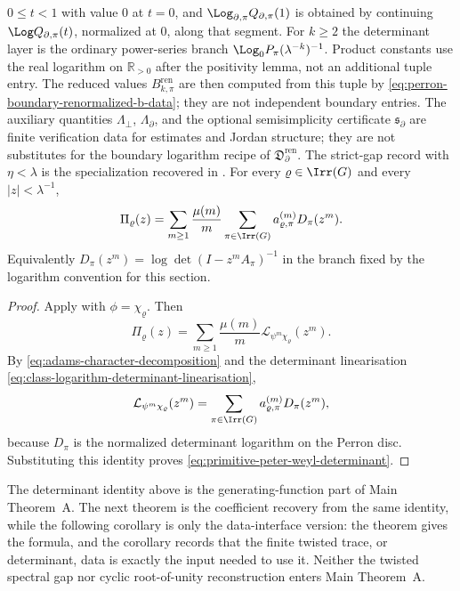 \begin{corollary}
  \(0\le t<1\) with value \(0\) at \(t=0\), and
  \(\Log_{\partial,\pi}Q_{\partial,\pi}(1)\) is obtained by continuing
  \(\Log Q_{\partial,\pi}(t)\), normalized at \(0\), along that segment.  For
  \(k\ge2\) the determinant layer is the ordinary power-series branch
  \(\Log_0P_\pi(\lambda^{-k})^{-1}\).  Product constants use the real logarithm on
  \(\mathbb R_{>0}\) after the positivity lemma, not an additional tuple
  entry.  The reduced values \(B_{k,\pi}^{\mathrm{ren}}\) are then computed
  from this tuple by \eqref{eq:perron-boundary-renormalized-b-data}; they are
  not independent boundary entries.  The auxiliary quantities
  \(\Lambda_\perp\), \(\Lambda_\partial\), and the optional semisimplicity
  certificate \(\mathfrak s_\partial\) are finite verification data for
  estimates and Jordan structure; they are not substitutes for the boundary
  logarithm recipe of \(\mathfrak D_{\partial}^{\mathrm{ren}}\).  The strict-gap
  record with \(\eta<\lambda\) is the specialization recovered in
  .
  For every \(\varrho\in\Irr(G)\) and every \(|z|<\lambda^{-1}\),
  \begin{equation}\label{eq:primitive-peter-weyl-determinant}
    \Pi_\varrho(z)
    =
    \sum_{m\ge 1}\frac{\mu(m)}{m}
      \sum_{\pi\in\Irr(G)}
        a_{\varrho,\pi}^{(m)}
        D_\pi(z^m).
  \end{equation}
  Equivalently \(D_\pi(z^m)=\log\det(I-z^mA_\pi)^{-1}\) in the branch
  fixed by the logarithm convention for this section.
\end{corollary}

\begin{proof}
  Apply  with
  \(\phi=\chi_\varrho\). Then
  \[
    \Pi_\varrho(z)
    =
    \sum_{m\ge 1}\frac{\mu(m)}{m}
      \mathcal L_{\psi^m\chi_\varrho}(z^m).
  \]
  By \eqref{eq:adams-character-decomposition} and the determinant
  linearisation \eqref{eq:class-logarithm-determinant-linearisation},
  \[
    \mathcal L_{\psi^m\chi_\varrho}(z^m)
    =
    \sum_{\pi\in\Irr(G)}
      a_{\varrho,\pi}^{(m)}
      D_\pi(z^m),
  \]
  because \(D_\pi\) is the normalized determinant logarithm on the
  Perron disc.
  Substituting this identity proves
  \eqref{eq:primitive-peter-weyl-determinant}.
\end{proof}

\noindent
The determinant identity above is the generating-function part of Main
Theorem~A.  The next theorem is the coefficient recovery from the same
identity, while the following corollary is only the data-interface version:
the theorem gives the formula, and the corollary records that the finite
twisted trace, or determinant, data is exactly the input needed to use it.
Neither the twisted spectral gap nor cyclic root-of-unity reconstruction
enters Main Theorem~A.

